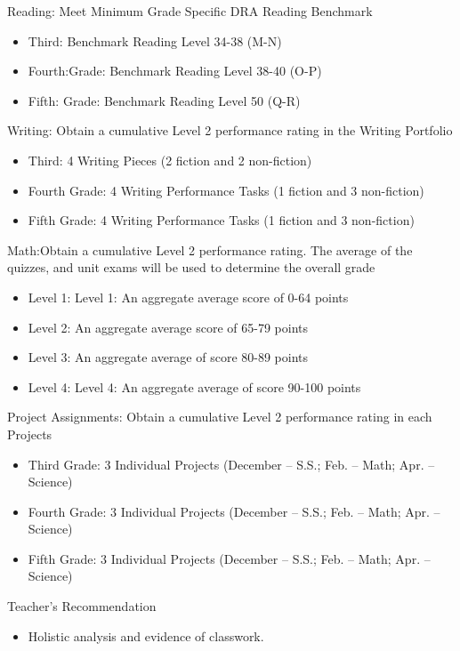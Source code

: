 \documentclass[12pt,letterpaper]{article}
\begin{document}
Reading: Meet Minimum Grade Specific DRA Reading Benchmark
\begin{itemize}
\item Third: Benchmark Reading Level 34-38 (M-N)
\item Fourth:Grade: Benchmark Reading Level 38-40 (O-P)
\item Fifth: Grade: Benchmark Reading Level 50 (Q-R)
\end{itemize}

Writing: Obtain a cumulative Level 2 performance rating in the Writing Portfolio
\begin{itemize}
\item Third: 4 Writing Pieces (2 fiction and 2 non-fiction)
\pagebreak
\vspace*{1.5cm}
\item Fourth Grade: 4 Writing Performance Tasks (1 fiction and 3 non-fiction)
\item Fifth Grade: 4 Writing Performance Tasks (1 fiction and 3 non-fiction)
\end{itemize}

Math:Obtain a cumulative Level 2 performance rating. The average of the quizzes, and unit exams will be used to determine the overall grade
\begin{itemize}
\item Level 1: Level 1: An aggregate average score of 0-64 points
\item Level 2: An aggregate average score of 65-79 points
\item Level 3: An aggregate average of score 80-89 points
\item Level 4: Level 4: An aggregate average of score 90-100 points
\end{itemize}

Project Assignments: Obtain a cumulative Level 2 performance rating in each Projects
\begin{itemize}
\item Third Grade: 3 Individual Projects (December – S.S.; Feb. – Math; Apr. – Science)
\item Fourth Grade: 3 Individual Projects (December – S.S.; Feb. – Math; Apr. – Science)
\item Fifth Grade: 3 Individual Projects (December – S.S.; Feb. – Math; Apr. – Science)
\end{itemize}

Teacher's Recommendation
\begin{itemize}
\item Holistic analysis and evidence of classwork.
\end{itemize}
\end{document}
